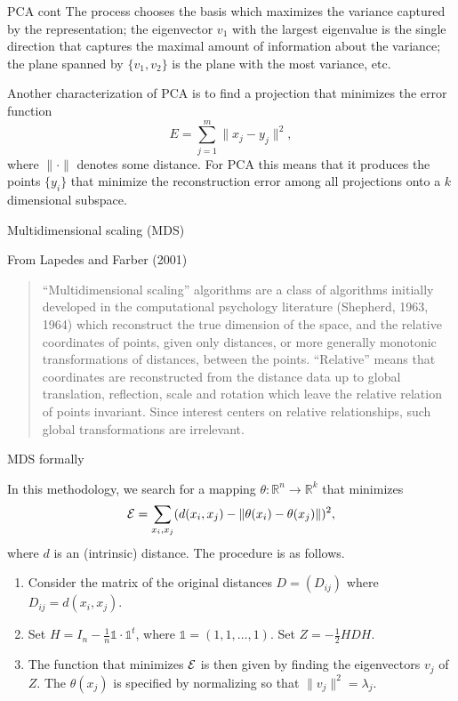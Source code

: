 \documentclass{beamer}
\begin{document}
\begin{frame}{PCA cont}
	The process chooses the basis which maximizes the variance captured by the representation; the eigenvector $v_1$ with the largest eigenvalue is the single direction that captures the maximal amount of information about the variance; the plane spanned by $\{v_1,v_2\}$ is the plane with the most variance, etc.
	
	Another characterization of PCA is to find a projection that minimizes the error function
	\begin{equation*}
		E= \sum_{j=1}^m \| x_j -y_j \|^2, 
	\end{equation*}
	where $\| \cdot \|$ denotes some distance. For PCA this means that it produces the points $\{y_i\}$ that minimize the reconstruction error among all projections onto a $k$ dimensional subspace. 
\end{frame}

\begin{frame}{Multidimensional scaling (MDS)}
	
From Lapedes and Farber (2001)
\begin{quote}
	``Multidimensional scaling'' algorithms are a class of algorithms
	initially developed in the computational psychology literature (Shepherd, 1963, 1964) which reconstruct the true dimension of the space, and the
	relative coordinates of points, given only distances, or more generally monotonic transformations of distances, between the points. ``Relative''
	means that coordinates are reconstructed from
	the distance data up to global translation, reflection, scale and rotation which leave the relative
	relation of points invariant. Since interest centers
	on relative relationships, such global transformations are irrelevant.
\end{quote}
	
\end{frame}

\begin{frame}{MDS formally}

In this methodology, we search for a mapping $\theta \colon \mathbb{R}^n \to \mathbb{R}^k$ that minimizes
\begin{equation*}
	{\cal E}= \sum_{x_i,x_j} ( d(x_i,x_j) - \|\theta(x_i)-\theta(x_j)\|)^2,
\end{equation*}
where $d$ is an (intrinsic) distance. 
The procedure is as follows. 
\begin{enumerate}
	\item Consider the matrix of the original distances $D=(D_{ij})$ where $D_{ij}= d(x_i,x_j)$. 
	\item Set $H= I_n - \frac{1}{n} \mathbb{1} \cdot \mathbb{1}^t$, where $\mathbb{1}= (1,1, \ldots, 1)$. Set $Z= -\frac{1}{2} H D H$.
	\item The function that minimizes $\cal E$ is then given by finding the eigenvectors $v_j$ of $Z$. The $\theta(x_j)$ is specified by normalizing so that $\|v_j\|^2=\lambda_j$.
\end{enumerate}
\end{frame}
\end{document}
